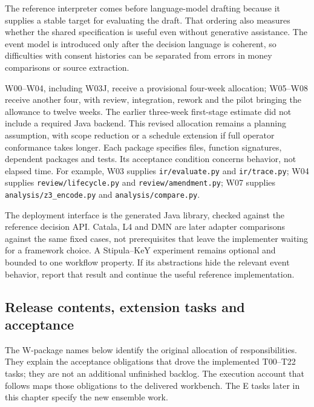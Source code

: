 \documentclass[12pt,a4paper,oneside,openany]{book}
\begin{document}
The reference interpreter comes before language-model drafting because it supplies
a stable target for evaluating the draft. That ordering also measures whether the
shared specification is useful even without generative assistance. The event
model is introduced only after the decision language is coherent, so difficulties
with consent histories can be separated from errors in money comparisons or
source extraction.

W00--W04, including W03J, receive a provisional four-week allocation; W05--W08
receive another four, with review, integration, rework and the pilot bringing
the allowance to twelve weeks. The earlier three-week first-stage estimate did
not include a required Java backend. This revised allocation remains a planning
assumption, with scope reduction or a schedule extension if full operator
conformance takes longer. Each package specifies files, function signatures, dependent
packages and tests. Its acceptance condition concerns behavior, not elapsed time.
For example, W03 supplies \texttt{ir/evaluate.py} and \texttt{ir/trace.py}; W04
supplies \texttt{review/lifecycle.py} and \texttt{review/amendment.py}; W07
supplies \texttt{analysis/z3\_encode.py} and \texttt{analysis/compare.py}.

The deployment interface is the generated Java library, checked against the
reference decision API. Catala, L4 and DMN
are later adapter comparisons against the same fixed cases, not prerequisites
that leave the implementer waiting for a framework choice. A Stipula--KeY
experiment remains optional and bounded to one workflow property. If its
abstractions hide the relevant event behavior, report that result and continue
the useful reference implementation.

\subsection{Release contents, extension tasks and acceptance}

The W-package names below identify the original allocation of responsibilities.
They explain the acceptance obligations that drove the implemented T00--T22
tasks; they are not an additional unfinished backlog. The execution account that
follows maps those obligations to the delivered workbench. The E tasks later in
this chapter specify the new ensemble work.


\label{merge:P-03d-java-delivery:06}
\end{document}
